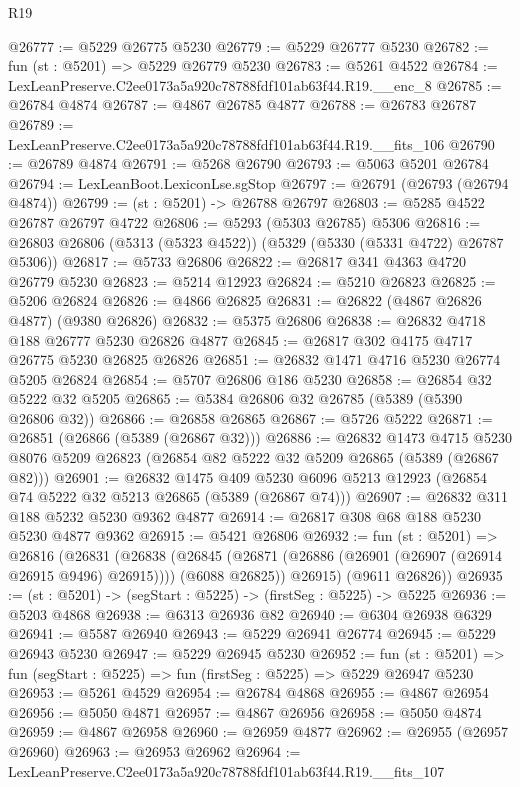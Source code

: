 \begin{lexlean}{R19}
\begin{coremodule}
@26777 := @5229 @26775 @5230
@26779 := @5229 @26777 @5230
@26782 := fun (st : @5201) => @5229 @26779 @5230
@26783 := @5261 @4522
@26784 := LexLeanPreserve.C2ee0173a5a920c78788fdf101ab63f44.R19.__enc_8
@26785 := @26784 @4874
@26787 := @4867 @26785 @4877
@26788 := @26783 @26787
@26789 := LexLeanPreserve.C2ee0173a5a920c78788fdf101ab63f44.R19.__fits_106
@26790 := @26789 @4874
@26791 := @5268 @26790
@26793 := @5063 @5201 @26784
@26794 := LexLeanBoot.LexiconLse.sgStop
@26797 := @26791 (@26793 (@26794 @4874))
@26799 := (st : @5201) -> @26788 @26797
@26803 := @5285 @4522 @26787 @26797 @4722
@26806 := @5293 (@5303 @26785) @5306
@26816 := @26803 @26806 (@5313 (@5323 @4522)) (@5329 (@5330 (@5331 @4722) @26787 @5306))
@26817 := @5733 @26806
@26822 := @26817 @341 @4363 @4720 @26779 @5230
@26823 := @5214 @12923
@26824 := @5210 @26823
@26825 := @5206 @26824
@26826 := @4866 @26825
@26831 := @26822 (@4867 @26826 @4877) (@9380 @26826)
@26832 := @5375 @26806
@26838 := @26832 @4718 @188 @26777 @5230 @26826 @4877
@26845 := @26817 @302 @4175 @4717 @26775 @5230 @26825 @26826
@26851 := @26832 @1471 @4716 @5230 @26774 @5205 @26824
@26854 := @5707 @26806 @186 @5230
@26858 := @26854 @32 @5222 @32 @5205
@26865 := @5384 @26806 @32 @26785 (@5389 (@5390 @26806 @32))
@26866 := @26858 @26865
@26867 := @5726 @5222
@26871 := @26851 (@26866 (@5389 (@26867 @32)))
@26886 := @26832
    @1473
    @4715
    @5230
    @8076
    @5209
    @26823
    (@26854 @82 @5222 @32 @5209 @26865 (@5389 (@26867 @82)))
@26901 := @26832
    @1475
    @409
    @5230
    @6096
    @5213
    @12923
    (@26854 @74 @5222 @32 @5213 @26865 (@5389 (@26867 @74)))
@26907 := @26832 @311 @188 @5232 @5230 @9362 @4877
@26914 := @26817 @308 @68 @188 @5230 @5230 @4877 @9362
@26915 := @5421 @26806
@26932 := fun (st : @5201) =>
  @26816
    (@26831
      (@26838
        (@26845 (@26871 (@26886 (@26901 (@26907 (@26914 @26915 @9496) @26915)))) (@6088 @26825))
        @26915)
      (@9611 @26826))
@26935 := (st : @5201) -> (segStart : @5225) -> (firstSeg : @5225) -> @5225
@26936 := @5203 @4868
@26938 := @6313 @26936 @82
@26940 := @6304 @26938 @6329
@26941 := @5587 @26940
@26943 := @5229 @26941 @26774
@26945 := @5229 @26943 @5230
@26947 := @5229 @26945 @5230
@26952 := fun (st : @5201) => fun (segStart : @5225) => fun (firstSeg : @5225) => @5229 @26947 @5230
@26953 := @5261 @4529
@26954 := @26784 @4868
@26955 := @4867 @26954
@26956 := @5050 @4871
@26957 := @4867 @26956
@26958 := @5050 @4874
@26959 := @4867 @26958
@26960 := @26959 @4877
@26962 := @26955 (@26957 @26960)
@26963 := @26953 @26962
@26964 := LexLeanPreserve.C2ee0173a5a920c78788fdf101ab63f44.R19.__fits_107

\end{coremodule}
\end{lexlean}
